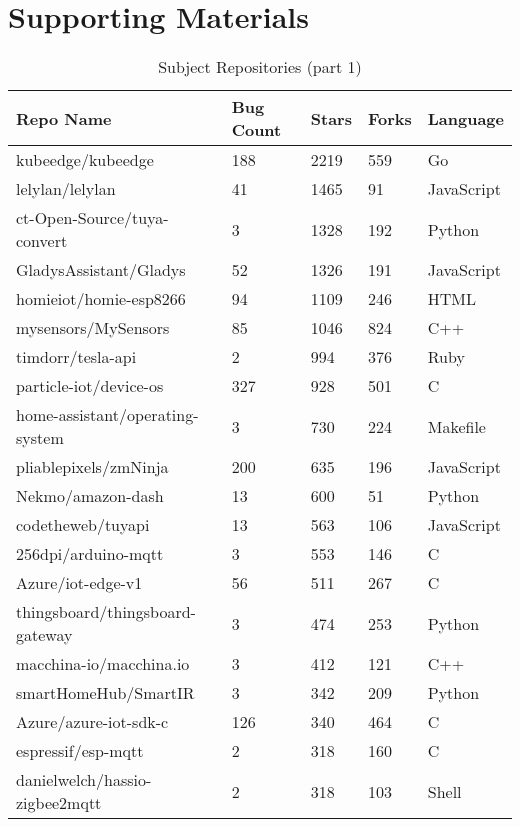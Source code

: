 \chapter{Supporting Materials}

\begin{table}
    \centering
    \caption{Subject Repositories (part 1)}
    \begin{tabular}{|l|l|l|l|l|}
    \hline
        \textbf{Repo Name} & \textbf{Bug Count} & \textbf{Stars} & \textbf{Forks} & \textbf{Language} \\ \hline
        kubeedge/kubeedge & 188 & 2219 & 559 & Go \\ \hline
        lelylan/lelylan & 41 & 1465 & 91 & JavaScript \\ \hline
        ct-Open-Source/tuya-convert & 3 & 1328 & 192 & Python \\ \hline
        GladysAssistant/Gladys & 52 & 1326 & 191 & JavaScript \\ \hline
        homieiot/homie-esp8266 & 94 & 1109 & 246 & HTML \\ \hline
        mysensors/MySensors & 85 & 1046 & 824 & C++ \\ \hline
        timdorr/tesla-api & 2 & 994 & 376 & Ruby \\ \hline
        particle-iot/device-os & 327 & 928 & 501 & C \\ \hline
        home-assistant/operating-system & 3 & 730 & 224 & Makefile \\ \hline
        pliablepixels/zmNinja & 200 & 635 & 196 & JavaScript \\ \hline
        Nekmo/amazon-dash & 13 & 600 & 51 & Python \\ \hline
        codetheweb/tuyapi & 13 & 563 & 106 & JavaScript \\ \hline
        256dpi/arduino-mqtt & 3 & 553 & 146 & C \\ \hline
        Azure/iot-edge-v1 & 56 & 511 & 267 & C \\ \hline
        thingsboard/thingsboard-gateway & 3 & 474 & 253 & Python \\ \hline
        macchina-io/macchina.io & 3 & 412 & 121 & C++ \\ \hline
        smartHomeHub/SmartIR & 3 & 342 & 209 & Python \\ \hline
        Azure/azure-iot-sdk-c & 126 & 340 & 464 & C \\ \hline
        espressif/esp-mqtt & 2 & 318 & 160 & C \\ \hline
        danielwelch/hassio-zigbee2mqtt & 2 & 318 & 103 & Shell \\ \hline

\end{tabular}
\end{table}
